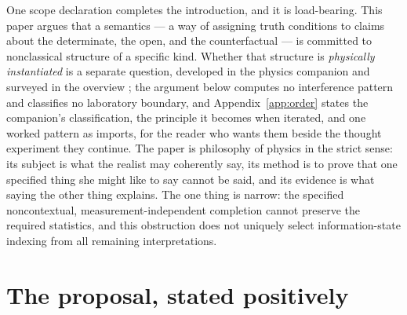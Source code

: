 One scope declaration completes the introduction, and it is load-bearing. This paper argues that a semantics --- a way of assigning truth conditions to claims about the determinate, the open, and the counterfactual --- is committed to nonclassical structure of a specific kind. Whether that structure is \emph{physically instantiated} is a separate question, developed in the physics companion and surveyed in the overview \cite{AethusQuant, AethusBrief}; the argument below computes no interference pattern and classifies no laboratory boundary, and Appendix~\ref{app:order} states the companion's classification, the principle it becomes when iterated, and one worked pattern as imports, for the reader who wants them beside the thought experiment they continue. The paper is philosophy of physics in the strict sense: its subject is what the realist may coherently say, its method is to prove that one specified thing she might like to say cannot be said, and its evidence is what saying the other thing explains. The one thing is narrow: the specified noncontextual, measurement-independent completion cannot preserve the required statistics, and this obstruction does not uniquely select information-state indexing from all remaining interpretations.

\section{The proposal, stated positively}\label{sec:positive}


